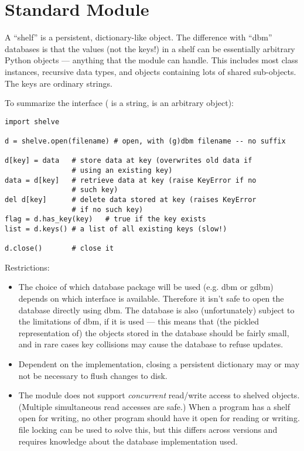\section{Standard Module }

A ``shelf'' is a persistent, dictionary-like object.  The difference
with ``dbm'' databases is that the values (not the keys!) in a shelf
can be essentially arbitrary Python objects --- anything that the
 module can handle.  This includes most class instances,
recursive data types, and objects containing lots of shared
sub-objects.  The keys are ordinary strings.

To summarize the interface ( is a string,  is an
arbitrary object):

\begin{verbatim}
import shelve

d = shelve.open(filename) # open, with (g)dbm filename -- no suffix

d[key] = data   # store data at key (overwrites old data if
                # using an existing key)
data = d[key]   # retrieve data at key (raise KeyError if no
                # such key)
del d[key]      # delete data stored at key (raises KeyError
                # if no such key)
flag = d.has_key(key)   # true if the key exists
list = d.keys() # a list of all existing keys (slow!)

d.close()       # close it
\end{verbatim}

Restrictions:

\begin{itemize}

\item
The choice of which database package will be used (e.g. dbm or gdbm)
depends on which interface is available.  Therefore it isn't safe to
open the database directly using dbm.  The database is also
(unfortunately) subject to the limitations of dbm, if it is used ---
this means that (the pickled representation of) the objects stored in
the database should be fairly small, and in rare cases key collisions
may cause the database to refuse updates.

\item
Dependent on the implementation, closing a persistent dictionary may
or may not be necessary to flush changes to disk.

\item
The  module does not support {\em concurrent} read/write
access to shelved objects.  (Multiple simultaneous read accesses are
safe.)  When a program has a shelf open for writing, no other program
should have it open for reading or writing.  \UNIX{} file locking can
be used to solve this, but this differs across \UNIX{} versions and
requires knowledge about the database implementation used.

\end{itemize}
